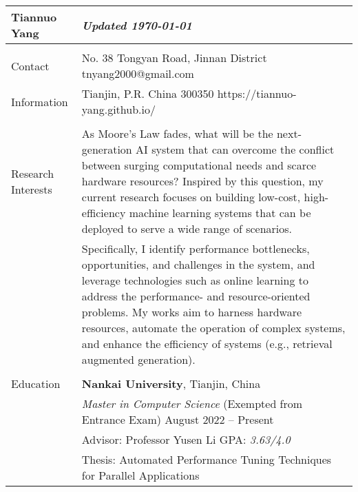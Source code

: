 \documentclass[letterpaper, 10pt]{article}
\begin{document}
\begin{longtable}{p{}p{}}

\textbf{Tiannuo Yang} & \hfill{\it\footnotesize Updated \today} \\
\hline \\



\textcolor{OliveGreen}{Contact} & No. 38 Tongyan Road, Jinnan District \hfill tnyang2000@gmail.com \\
\textcolor{OliveGreen}{Information} & Tianjin, P.R. China 300350 \hfill  https://tiannuo-yang.github.io/ \\
& \\



\nohyphens{\textcolor{OliveGreen}{Research Interests}}
& As Moore’s Law fades, what will be the next-generation AI system that can overcome the conflict between surging computational needs and scarce hardware resources? Inspired by this question, my current research focuses on building low-cost, high-efficiency machine learning systems that can be deployed to serve a wide range of scenarios.
\vspace{0.01\textwidth} \\
& Specifically, I identify performance bottlenecks, opportunities, and challenges in the system, and leverage technologies such as online learning to address the performance- and resource-oriented problems. My works aim to harness hardware resources, automate the operation of complex systems, and enhance the efficiency of systems (e.g., retrieval augmented generation). \\
& \\



\textcolor{OliveGreen}{Education} 
& \textbf{Nankai University}, Tianjin, China \\ 
& \textit{Master in Computer Science} (Exempted from Entrance Exam) \hfill August 2022 -- Present \\
& Advisor: Professor Yusen Li \hspace{0.04\textwidth} GPA: \textit{3.63/4.0} \\
& Thesis: Automated Performance Tuning Techniques for Parallel Applications \vspace{0.01\textwidth} \\


\end{longtable}
\end{document}
